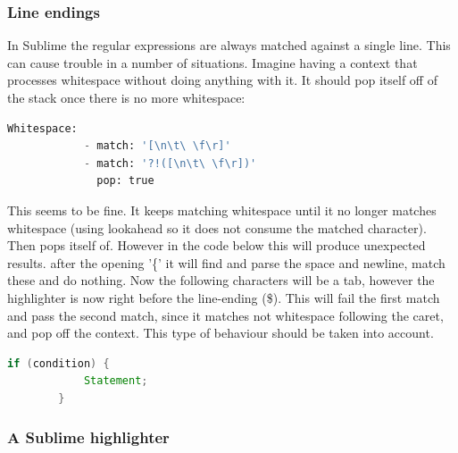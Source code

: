 		\subsubsection{Line endings} \label{sec:SublimeSyntax:LineEndings}
		In Sublime the regular expressions are always matched against a single line. This can cause trouble in a number of situations. Imagine having a context that processes whitespace without doing anything with it. It should pop itself off of the stack once there is no more whitespace:
		\begin{lstlisting}[language=Python]
		Whitespace:
			- match: '[\n\t\ \f\r]'
			- match: '?!([\n\t\ \f\r])'
			  pop: true
		\end{lstlisting}	
		This seems to be fine. It keeps matching whitespace until it no longer matches whitespace (using lookahead so it does not consume the matched character). Then pops itself of. However in the code below this will produce unexpected results. after the opening '\{' it will find and parse the space and newline, match these and do nothing. Now the following characters will be a tab, however the highlighter is now right before the line-ending (\$). This will fail the first match and pass the second match, since it matches not whitespace following the caret, and pop off the context. This type of behaviour should be taken into account. 
		\begin{lstlisting}[language=Java]
		if (condition) { 
			Statement;
		}
		\end{lstlisting}
		\pagebreak	
		
	\subsubsection{A Sublime highlighter}
	